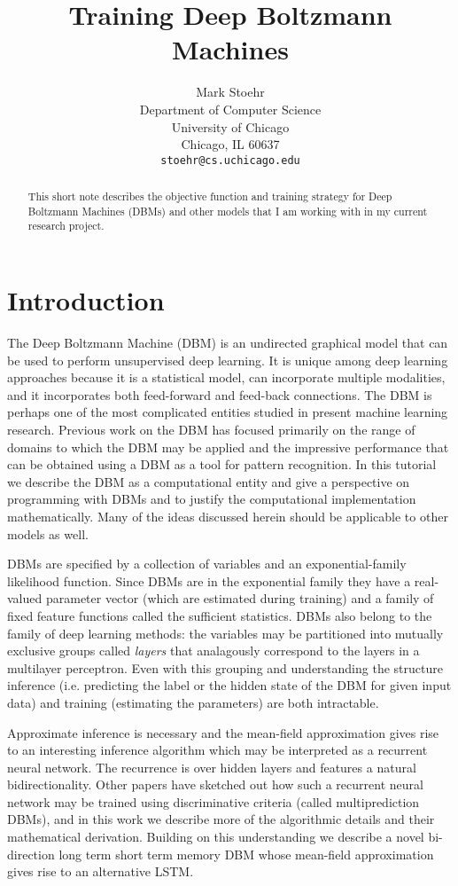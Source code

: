 \documentclass{article} %
\title{Training Deep Boltzmann Machines}
\author{
Mark Stoehr %
\\
Department of Computer Science\\
University of Chicago\\
Chicago, IL 60637 \\
\texttt{stoehr@cs.uchicago.edu} \\
}
\begin{document}
\maketitle

\begin{abstract}
This short note describes the objective function and training strategy for Deep Boltzmann Machines (DBMs)
and other models that I am working with in my current research project.
\end{abstract}

\section{Introduction}

The Deep Boltzmann Machine (DBM) is an undirected graphical model that
can be used to perform unsupervised deep learning. It is unique among deep learning approaches
because it is a statistical model, can incorporate multiple modalities, and it incorporates both feed-forward
and feed-back connections. The DBM is perhaps one of the most complicated
entities studied in present machine learning research.  Previous work on the DBM has focused primarily on the
range of domains to which the DBM may be applied and the impressive performance that can be obtained using a DBM
as a tool for pattern recognition.  In this tutorial we describe the DBM as a computational entity and give
a perspective on programming with DBMs and to justify the computational implementation
mathematically.  Many of the ideas discussed herein should be applicable to other models as well.

DBMs are specified by a collection of variables and an
exponential-family likelihood function.  Since DBMs are in the
exponential family they have a real-valued parameter vector (which are
estimated during training) and a family of fixed feature functions
called the sufficient statistics.  DBMs also belong to the family of
deep learning methods: the variables may be partitioned into mutually
exclusive groups called {\it layers} that analagously correspond to the
layers in a multilayer perceptron. Even with this grouping and
understanding the structure inference (i.e. predicting the label or
the hidden state of the DBM for given input data) and training (estimating the parameters) are both intractable.

Approximate inference is necessary and the mean-field approximation gives rise to an interesting inference algorithm
which may be interpreted as a recurrent neural network.  The recurrence is over hidden layers and features a natural
bidirectionality.  Other papers have sketched out how such a recurrent neural network may be trained using discriminative
criteria (called multiprediction DBMs), and in this work we describe more of the algorithmic details and their
mathematical derivation.  Building on this understanding we describe a novel bi-direction long term short term memory
DBM whose mean-field approximation gives rise to an alternative LSTM.
\end{document}
